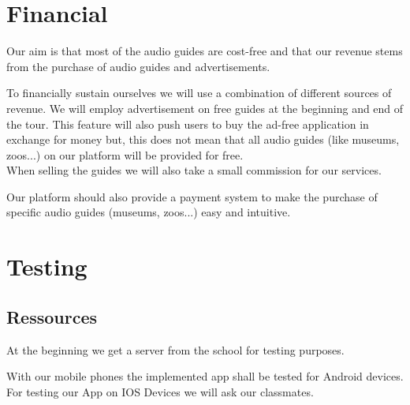 \documentclass[12pt]{article}
\theoremstyle{definition}
\newenvironment{text}{
}{}
\begin{document}
\section{Financial}
\begin{text} 
Our aim is that most of the audio guides are cost-free and that our revenue stems from the purchase of audio guides and advertisements.\newline

To financially sustain ourselves we will use a combination of different sources of revenue. We will employ advertisement on free guides at the beginning and end of the tour. This feature will also push users to buy the ad-free application in exchange for money but, this does not mean that all audio guides (like museums, zoos...) on our platform will be provided for free. \\
When selling the guides we will also take a small commission for our services.\newline

Our platform should also provide a payment system to make the purchase of specific audio guides (museums, zoos...) easy and intuitive. 
\end{text}

\pagebreak
\section{Testing}
\subsection{Ressources}
\begin {text}
At the beginning we get a server from the school for testing purposes.\newline

With our mobile phones the implemented app shall be tested for Android devices. For testing our App on IOS Devices we will ask our classmates.
\end{text}
\end{document}
